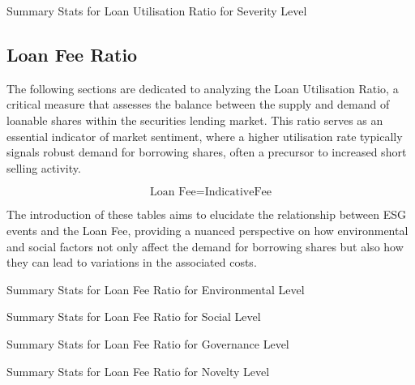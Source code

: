 \begin{table}[H]
\caption{Summary Stats for Loan Utilisation Ratio for Severity Level}
\centering

\label{table:loan_utilisation_ratio_severity.tex}
\end{table}


\subsection{Loan Fee Ratio}

The following sections are dedicated to analyzing the Loan Utilisation Ratio, a critical measure that assesses the balance between the supply and demand of loanable shares within the securities lending market. This ratio serves as an essential indicator of market sentiment, where a higher utilisation rate typically signals robust demand for borrowing shares, often a precursor to increased short selling activity.

 \begin{equation}
	\text{Loan Fee} = \text{IndicativeFee}
	\label{eq:Loan_Fee}
\end{equation}

The introduction of these tables aims to elucidate the relationship between ESG events and the Loan Fee, providing a nuanced perspective on how environmental and social factors not only affect the demand for borrowing shares but also how they can lead to variations in the associated costs.

\begin{table}[H]
\caption{Summary Stats for Loan Fee Ratio for Environmental Level}
\centering

\label{table:loan_fee_environment.tex}
\end{table}

\begin{table}[H]
\caption{Summary Stats for Loan Fee Ratio for Social Level}
\centering

\label{table:loan_fee_social.tex}
\end{table}

\begin{table}[H]
\caption{Summary Stats for Loan Fee Ratio for Governance Level}
\centering

\label{table:loan_fee_governance.tex}
\end{table}


\begin{table}[H]
\caption{Summary Stats for Loan Fee Ratio for Novelty Level}
\centering

\label{table:loan_fee_novelty.tex}
\end{table}

